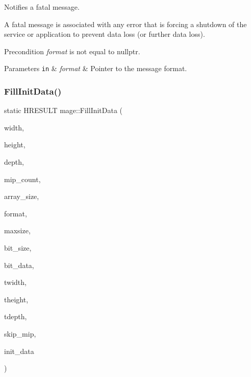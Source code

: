 Notifies a fatal message.

A fatal message is associated with any error that is forcing a shutdown of the service or application to prevent data loss (or further data loss).

\begin{DoxyPrecond}{Precondition}
{\itshape format} is not equal to {\ttfamily nullptr}. 
\end{DoxyPrecond}

\begin{DoxyParams}[1]{Parameters}
\mbox{\tt in}  & {\em format} & Pointer to the message format. \\
\hline
\end{DoxyParams}
\hypertarget{namespacemage_ac20162a68be6828c38072a3afb0711c1}{}\label{namespacemage_ac20162a68be6828c38072a3afb0711c1} 
\subsubsection{\texorpdfstring{Fill\+Init\+Data()}{FillInitData()}}
{\footnotesize\ttfamily static H\+R\+E\+S\+U\+LT mage\+::\+Fill\+Init\+Data (\begin{DoxyParamCaption}\item[{\+\_\+\+In\+\_\+ size\+\_\+t}]{width,  }\item[{\+\_\+\+In\+\_\+ size\+\_\+t}]{height,  }\item[{\+\_\+\+In\+\_\+ size\+\_\+t}]{depth,  }\item[{\+\_\+\+In\+\_\+ size\+\_\+t}]{mip\+\_\+count,  }\item[{\+\_\+\+In\+\_\+ size\+\_\+t}]{array\+\_\+size,  }\item[{\+\_\+\+In\+\_\+ D\+X\+G\+I\+\_\+\+F\+O\+R\+M\+AT}]{format,  }\item[{\+\_\+\+In\+\_\+ size\+\_\+t}]{maxsize,  }\item[{\+\_\+\+In\+\_\+ size\+\_\+t}]{bit\+\_\+size,  }\item[{\+\_\+\+In\+\_\+reads\+\_\+bytes\+\_\+(bit\+\_\+size) const uint8\+\_\+t $\ast$}]{bit\+\_\+data,  }\item[{\+\_\+\+Out\+\_\+ size\+\_\+t \&}]{twidth,  }\item[{\+\_\+\+Out\+\_\+ size\+\_\+t \&}]{theight,  }\item[{\+\_\+\+Out\+\_\+ size\+\_\+t \&}]{tdepth,  }\item[{\+\_\+\+Out\+\_\+ size\+\_\+t \&}]{skip\+\_\+mip,  }\item[{\+\_\+\+Out\+\_\+writes\+\_\+(mip\+\_\+count $\ast$array\+\_\+size) D3\+D11\+\_\+\+S\+U\+B\+R\+E\+S\+O\+U\+R\+C\+E\+\_\+\+D\+A\+TA $\ast$}]{init\+\_\+data }\end{DoxyParamCaption})\hspace{0.3cm}{\ttfamily [static]}}

